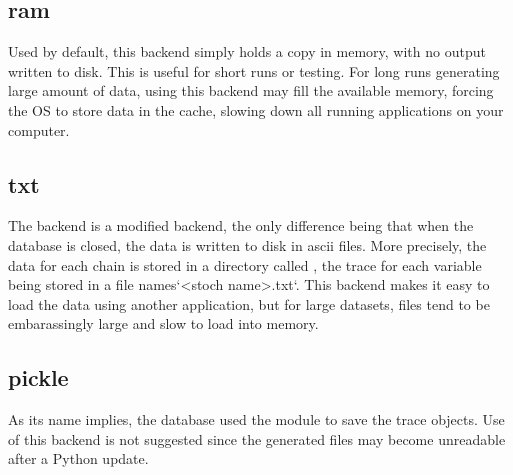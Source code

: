 
\hypertarget{ram}{}
\subsection*{ram}
\label{ram}

Used by default, this backend simply holds a copy in memory, with no output written to disk. This is useful for short runs or testing. For long runs generating large amount of data, using this backend may fill the available memory, forcing the OS to store data in the cache, slowing down all running applications on your computer.



\hypertarget{txt}{}
\subsection*{txt}
\label{txt}

The  backend is a modified  backend, the only difference being that when the database is closed, the data is written to disk in ascii files. More precisely, the data for each chain is stored in a directory called , the trace for each variable being stored in a file names`{\textless}stoch name{\textgreater}.txt`. This backend makes it easy to load the data using another application, but for large datasets, files tend to be embarassingly large and slow to load into memory.



\hypertarget{pickle}{}
\subsection*{pickle}
\label{pickle}

As its name implies, the  database used the  module to save the trace objects. Use of this backend is not suggested since the generated files may become unreadable after a Python update.



\hypertarget{sqlite}{}

